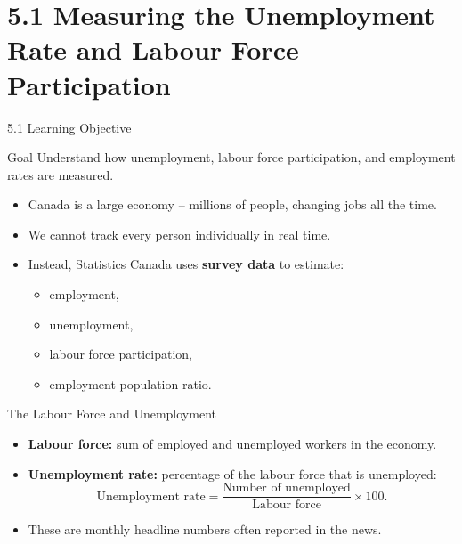 \documentclass[aspectratio=169]{beamer}
\begin{document}
\section{5.1 Measuring the Unemployment Rate and Labour Force Participation}

\begin{frame}{5.1 Learning Objective}
\transfade
\begin{block}{Goal}
Understand how unemployment, labour force participation, and employment rates are measured.
\end{block}
\begin{itemize}
  \item Canada is a large economy – millions of people, changing jobs all the time.
  \item We cannot track every person individually in real time.
  \item Instead, Statistics Canada uses \textbf{survey data} to estimate:
  \begin{itemize}
    \item employment,
    \item unemployment,
    \item labour force participation,
    \item employment-population ratio.
  \end{itemize}
\end{itemize}
\end{frame}

\begin{frame}{The Labour Force and Unemployment}
\transfade
\begin{itemize}
  \item \textbf{Labour force:} sum of \alert{employed} and \alert{unemployed} workers in the economy.
  \item \textbf{Unemployment rate:} percentage of the labour force that is unemployed:
  \[
    \text{Unemployment rate} = 
    \frac{\text{Number of unemployed}}{\text{Labour force}} \times 100.
  \]
  \item These are monthly headline numbers often reported in the news.
\end{itemize}
\end{frame}
\end{document}
